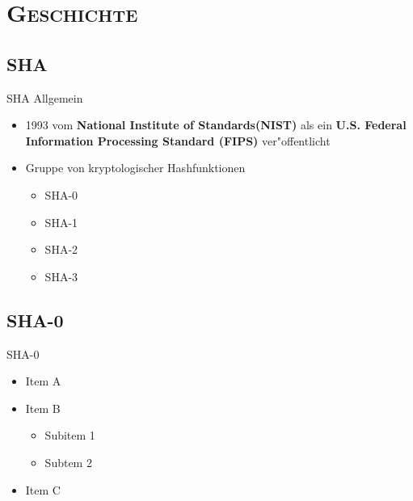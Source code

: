 \documentclass[xcolor=x11names,compress]{beamer}
\renewcommand{\(}{\begin{columns}}
\renewcommand{\)}{\end{columns}}
\newcommand{\<}[1]{\begin{column}{#1}}
\renewcommand{\>}{\end{column}}
\begin{document}
\section{\scshape Geschichte}
\subsection{SHA}
\begin{frame}{SHA Allgemein}
\begin{itemize}


\item 1993 vom {\bf National Institute of Standards(NIST)} 
als ein {\bf U.S. Federal Information Processing Standard (FIPS)} 
ver"offentlicht

	\pause
\item Gruppe von kryptologischer Hashfunktionen
	\begin{itemize}
		\item SHA-0	
		\item SHA-1
		\item SHA-2
		\item SHA-3
	\end{itemize}

\end{itemize}
\end{frame}

\subsection{SHA-0}
\begin{frame}{SHA-0}
\begin{itemize}
\item Item A
	\pause
\item Item B

\begin{itemize}
\item Subitem 1
\item Subtem 2
\end{itemize}

\item Item C
\end{itemize}
\end{frame}
\end{document}

